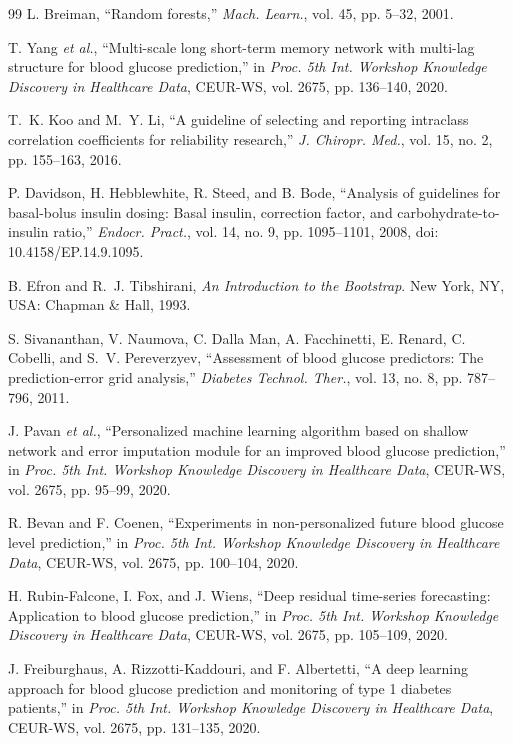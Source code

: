 \documentclass[journal]{IEEEtran}
\begin{document}
\begin{thebibliography}{99}
\label{ref55label} L. Breiman, ``Random forests,'' \emph{Mach. Learn.}, vol. 45, pp. 5--32, 2001.

\label{ref64label} T. Yang \emph{et al.}, ``Multi-scale long short-term memory network with multi-lag structure for blood glucose prediction,'' in \emph{Proc. 5th Int. Workshop Knowledge Discovery in Healthcare Data}, CEUR-WS, vol. 2675, pp. 136--140, 2020.

\label{ref76label} T.~K. Koo and M.~Y. Li, ``A guideline of selecting and reporting intraclass correlation coefficients for reliability research,'' \emph{J. Chiropr. Med.}, vol. 15, no. 2, pp. 155--163, 2016.

\label{ref77label} P. Davidson, H. Hebblewhite, R. Steed, and B. Bode, ``Analysis of guidelines for basal-bolus insulin dosing: Basal insulin, correction factor, and carbohydrate-to-insulin ratio,'' \emph{Endocr. Pract.}, vol. 14, no. 9, pp. 1095--1101, 2008, doi: 10.4158/EP.14.9.1095.

\label{ref78label} B. Efron and R.~J. Tibshirani, \emph{An Introduction to the Bootstrap}. New York, NY, USA: Chapman \& Hall, 1993.

\label{ref53label} S. Sivananthan, V. Naumova, C. Dalla Man, A. Facchinetti, E. Renard, C. Cobelli, and S.~V. Pereverzyev, ``Assessment of blood glucose predictors: The prediction-error grid analysis,'' \emph{Diabetes Technol. Ther.}, vol. 13, no. 8, pp. 787--796, 2011.

\label{ref60label} J. Pavan \emph{et al.}, ``Personalized machine learning algorithm based on shallow network and error imputation module for an improved blood glucose prediction,'' in \emph{Proc. 5th Int. Workshop Knowledge Discovery in Healthcare Data}, CEUR-WS, vol. 2675, pp. 95--99, 2020.

\label{ref61label} R. Bevan and F. Coenen, ``Experiments in non-personalized future blood glucose level prediction,'' in \emph{Proc. 5th Int. Workshop Knowledge Discovery in Healthcare Data}, CEUR-WS, vol. 2675, pp. 100--104, 2020.

\label{ref62label} H. Rubin-Falcone, I. Fox, and J. Wiens, ``Deep residual time-series forecasting: Application to blood glucose prediction,'' in \emph{Proc. 5th Int. Workshop Knowledge Discovery in Healthcare Data}, CEUR-WS, vol. 2675, pp. 105--109, 2020.

\label{ref63label} J. Freiburghaus, A. Rizzotti-Kaddouri, and F. Albertetti, ``A deep learning approach for blood glucose prediction and monitoring of type 1 diabetes patients,'' in \emph{Proc. 5th Int. Workshop Knowledge Discovery in Healthcare Data}, CEUR-WS, vol. 2675, pp. 131--135, 2020.


\end{thebibliography}
\end{document}
